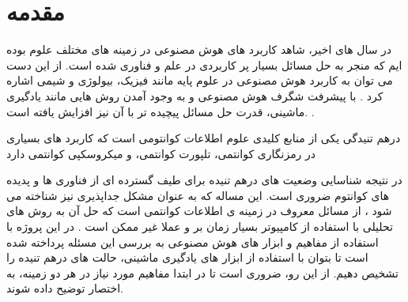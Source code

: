 \section{مقدمه}


در سال های اخیر، شاهد کاربرد های هوش مصنوعی در زمینه های مختلف علوم بوده ایم که منجر به حل مسائل بسیار پر کاربردی در علم و فناوری شده است. از این دست می توان به کاربرد هوش مصنوعی در علوم پایه مانند فیزیک، بیولوژی و شیمی اشاره کرد
\cite{Taddeo2018}.
با پیشرفت شگرف هوش مصنوعی و به وجود آمدن روش هایی مانند یادگیری ماشینی، قدرت حل مسائل پیچیده تر با آن نیز افزایش یافته است.
\cite{chen2019}.

درهم تنیدگی یکی از منابع کلیدی علوم اطلاعات کوانتومی است که کاربرد های بسیاری در رمزنگاری کوانتمی، تلپورت کوانتمی، و میکروسکپی کوانتمی دارد

در نتیجه شناسایی وضعیت های درهم تنیده برای طیف گسترده ای از فناوری ها و پدیده های کوانتوم ضروری است. این مساله که به عنوان مشکل جداپذیری نیز شناخته می شود
\cite{horodecki_1996}،
از مسائل معروف در زمینه ی اطلاعات کوانتمی است که حل آن به روش های تحلیلی با استفاده از کامپیوتر بسیار زمان بر و عملا غیر ممکن است
\cite{gharibia_2010}.
در این پروژه با استفاده از مفاهیم و ابزار های هوش مصنوعی به بررسی این مسئله پرداخته شده است تا بتوان با استفاده از ابزار های یادگیری ماشینی، حالت های درهم تنیده را تشخیص دهیم.
 از این رو، ضروری است تا در ابتدا مفاهیم مورد نیاز در هر دو زمینه، به اختصار توضیح داده شوند.
